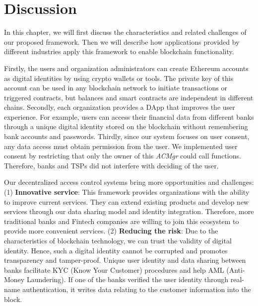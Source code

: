 \chapter{Discussion}
\label{chapter:discussion}

In this chapter, we will first discuss the characteristics and related challenges of our proposed framework. Then we will describe how applications provided by different industries apply this framework to enable blockchain functionality.
\par 

Firstly, the users and organization administrators can create Ethereum accounts as digital identities by using crypto wallets or tools. The private key of this account can be used in any blockchain network to initiate transactions or triggered contracts, but balances and smart contracts are independent in different chains. Secondly, each organization provides a DApp that improves the user experience. For example, users can access their financial data from different banks through a unique digital identity stored on the blockchain without remembering bank accounts and passwords. Thirdly, since our system focuses on user consent, any data access must obtain permission from the user. We implemented user consent by restricting that only the owner of this \textit{ACMgr} could call functions. Therefore, banks and TSPs did not interfere with deciding of the user.
\par 

Our decentralized access control systems bring more opportunities and challenges: (1) \textbf{Innovative service}: This framework provides organizations with the ability to improve current services. They can extend existing products and develop new services through our data sharing model and identity integration. Therefore, more traditional banks and Fintech companies are willing to join this ecosystem to provide more convenient services.  (2) \textbf{Reducing the risk}: Due to the characteristics of blockchain technology, we can trust the validity of digital identity. Hence, such a digital identity cannot be corrupted and promotes transparency and tamper-proof. Unique user identity and data sharing between banks facilitate KYC (Know Your Customer) procedures and help AML (Anti-Money Laundering). If one of the banks verified the user identity through real-name authentication, it writes data relating to the customer information into the block.

